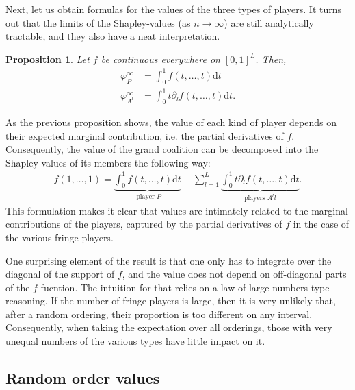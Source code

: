 \documentclass[a4paper]{article}
\newtheorem{proposition}{Proposition}
\newcommand{\dt}{\mathrm{d}t}
\begin{document}
Next, let us obtain formulas for the values of the three types of players.
It turns out that the limits of the Shapley-values (as $n \to \infty$) are still analytically tractable, and they also have a neat interpretation.
\begin{proposition}
    Let $f$ be continuous everywhere on $[0, 1]^L$.
    Then,
    \begin{align*}
        \varphi_P^\infty & = \int_0^1 f(t, \dots, t) \dt                                 \\
        \varphi_{A^l}^\infty & = \int_0^1 t \partial_l f(t, \dots, t) \dt.
    \end{align*}
\end{proposition}

As the previous proposition shows, the value of each kind of player depends on their expected marginal contribution, i.e. the partial derivatives of $f$.
Consequently, the value of the grand coalition can be decomposed into the Shapley-values of its members the following way:
\begin{align*}
    f(1, \dots, 1) = \underbrace{\int_0^1 f(t, \dots, t) \dt}_{\text{ player } P} + \sum_{l=1}^L \underbrace{\int_0^1 t \partial_l f(t, \dots, t) \dt}_{\text{players } A^ll}.
\end{align*}
This formulation makes it clear that values are intimately related to the marginal contributions of the players, captured by the partial derivatives of $f$ in the case of the various fringe players.

One surprising element of the result is that one only has to integrate over the diagonal of the support  of $f$, and the value does not depend on off-diagonal parts of the $f$ fucntion.
The intuition for that relies on a law-of-large-numbers-type reasoning.
If the number of fringe players is large, then it is very unlikely that, after a random ordering, their proportion is too different on any interval.
Consequently, when taking the expectation over all orderings, those with very unequal numbers of the various types have little impact on it.


\subsection{Random order values}
\end{document}
